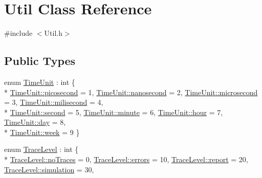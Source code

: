 \hypertarget{class_util}{\section{Util Class Reference}
\label{class_util}
}


{\ttfamily \#include $<$Util.\-h$>$}

\subsection*{Public Types}
\begin{DoxyCompactItemize}
\item 
enum \hyperlink{class_util_a28504cc2fecc9aa47154cba4e625ec6f}{Time\-Unit} \-: int \{ \\*
\hyperlink{class_util_a28504cc2fecc9aa47154cba4e625ec6fa50260728dd9e5aa12e649cbfc7d99e2d}{Time\-Unit\-::picosecond} = 1, 
\hyperlink{class_util_a28504cc2fecc9aa47154cba4e625ec6fa0d7938bf86d4dc7a82f872433a9e1a1c}{Time\-Unit\-::nanosecond} = 2, 
\hyperlink{class_util_a28504cc2fecc9aa47154cba4e625ec6faf4b6d59819445e05b152c708db4ede10}{Time\-Unit\-::microsecond} = 3, 
\hyperlink{class_util_a28504cc2fecc9aa47154cba4e625ec6fa40974a3007d9bde9588006a36d0c9ab5}{Time\-Unit\-::milisecond} = 4, 
\\*
\hyperlink{class_util_a28504cc2fecc9aa47154cba4e625ec6faa9f0e61a137d86aa9db53465e0801612}{Time\-Unit\-::second} = 5, 
\hyperlink{class_util_a28504cc2fecc9aa47154cba4e625ec6fa0a7d55be9d12a369a6a8da0fb517fba4}{Time\-Unit\-::minute} = 6, 
\hyperlink{class_util_a28504cc2fecc9aa47154cba4e625ec6fa896c55cc5e46fab38ce9f51ebf7bfcd3}{Time\-Unit\-::hour} = 7, 
\hyperlink{class_util_a28504cc2fecc9aa47154cba4e625ec6fa628b7db04235f228d40adc671413a8c8}{Time\-Unit\-::day} = 8, 
\\*
\hyperlink{class_util_a28504cc2fecc9aa47154cba4e625ec6fa172a8327fcd3685ab3c0f740d031da09}{Time\-Unit\-::week} = 9
 \}
\item 
enum \hyperlink{class_util_a0a3482cfa2d915e261c0cf528fdc7afc}{Trace\-Level} \-: int \{ \\*
\hyperlink{class_util_a0a3482cfa2d915e261c0cf528fdc7afca35fc71c3d52efde9c56df6874ac1258c}{Trace\-Level\-::no\-Traces} = 0, 
\hyperlink{class_util_a0a3482cfa2d915e261c0cf528fdc7afca07213a0161f52846ab198be103b5ab43}{Trace\-Level\-::errors} = 10, 
\hyperlink{class_util_a0a3482cfa2d915e261c0cf528fdc7afcae98d2f001da5678b39482efbdf5770dc}{Trace\-Level\-::report} = 20, 
\hyperlink{class_util_a0a3482cfa2d915e261c0cf528fdc7afca9e083ec666c9f3db044bb7c381640227}{Trace\-Level\-::simulation} = 30, 

\end{DoxyCompactItemize}
